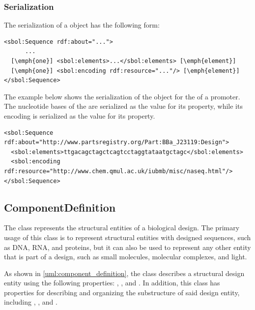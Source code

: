 \subsubsection*{Serialization}
The serialization of a  object has the following form:
\begin{lstlisting}
<sbol:Sequence rdf:about="...">
      ...
  [\emph{one}] <sbol:elements>...</sbol:elements> [\emph{element}]
  [\emph{one}] <sbol:encoding rdf:resource="..."/> [\emph{element}]
</sbol:Sequence>
\end{lstlisting}

The example below shows the serialization of the  object for the  of a promoter. The nucleotide bases of the  are serialized as the  value for its  property, while its  encoding is serialized as the  value for its   property. 

\begin{lstlisting}
<sbol:Sequence rdf:about="http://www.partsregistry.org/Part:BBa_J23119:Design">
  <sbol:elements>ttgacagctagctcagtcctaggtataatgctagc</sbol:elements>
  <sbol:encoding rdf:resource="http://www.chem.qmul.ac.uk/iubmb/misc/naseq.html"/>
</sbol:Sequence>
\end{lstlisting}


\subsection{ComponentDefinition}
\label{sec:ComponentDefinition}

The  class represents the structural entities of a biological design. The primary usage of this class is to represent structural entities with designed sequences, such as DNA, RNA, and proteins, but it can also be used to represent any other entity that is part of a design, such as small molecules, molecular complexes, and light. 

As shown in \ref{uml:component_definition}, the  class describes a structural design entity using the following properties: , , and . In addition, this class has properties for describing and organizing the substructure of said design entity, including , , and  .



